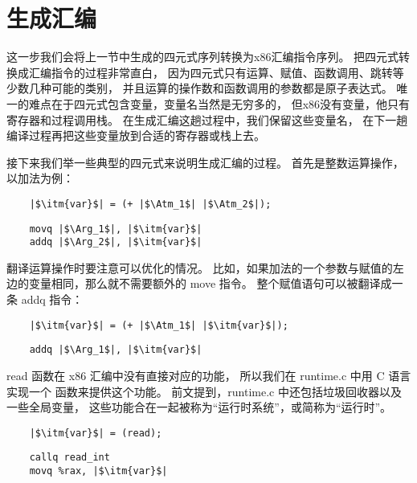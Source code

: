 
\section{生成汇编}
\label{sec:x86}

这一步我们会将上一节中生成的四元式序列转换为x86汇编指令序列。
把四元式转换成汇编指令的过程非常直白，
因为四元式只有运算、赋值、函数调用、跳转等少数几种可能的类别，
并且运算的操作数和函数调用的参数都是原子表达式。
唯一的难点在于四元式包含变量，变量名当然是无穷多的，
但x86没有变量，他只有寄存器和过程调用栈。
在生成汇编这趟过程中，我们保留这些变量名，
在下一趟编译过程再把这些变量放到合适的寄存器或栈上去。

接下来我们举一些典型的四元式来说明生成汇编的过程。
首先是整数运算操作，以加法为例：
\begin{transformation}
\begin{lstlisting}
    |$\itm{var}$| = (+ |$\Atm_1$| |$\Atm_2$|);
\end{lstlisting}
\compilesto
\begin{lstlisting}
    movq |$\Arg_1$|, |$\itm{var}$|
    addq |$\Arg_2$|, |$\itm{var}$|
\end{lstlisting}
\end{transformation}

翻译运算操作时要注意可以优化的情况。
比如，如果加法的一个参数与赋值的左边的变量相同，那么就不需要额外的 move 指令。
整个赋值语句可以被翻译成一条 addq 指令：
\begin{transformation}
\begin{lstlisting}
    |$\itm{var}$| = (+ |$\Atm_1$| |$\itm{var}$|);
\end{lstlisting}
\compilesto
\begin{lstlisting}
    addq |$\Arg_1$|, |$\itm{var}$|
\end{lstlisting}
\end{transformation}

read 函数在 x86 汇编中没有直接对应的功能，
所以我们在 runtime.c 中用 C 语言实现一个  函数来提供这个功能。
前文提到，runtime.c 中还包括垃圾回收器以及一些全局变量，
这些功能合在一起被称为“运行时系统”，或简称为“运行时”。
\begin{transformation}
\begin{lstlisting}
    |$\itm{var}$| = (read);
\end{lstlisting}
\compilesto
\begin{lstlisting}
    callq read_int
    movq %rax, |$\itm{var}$|
\end{lstlisting}
\end{transformation}

